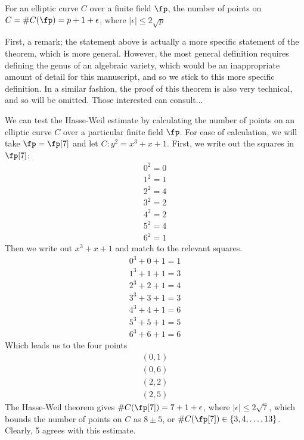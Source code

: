 
\begin{theorem}
For an elliptic curve $C$ over a finite field $\fp$, the number of points on $C = \#C(\fp) = p + 1 + \epsilon$, where $|\epsilon| \leq 2\sqrt{p}$
\end{theorem}
\begin{sproof}
	First, a remark; the statement above is actually a more specific statement of the theorem, which is more general. However, the most general definition requires defining the genus of an algebraic variety, which would be an inappropriate amount of detail for this manuscript, and so we stick to this more specific definition.
	In a similar fashion, the proof of this theorem is also very technical, and so will be omitted. Those interested can consult...
\end{sproof}
We can test the Hasse-Weil estimate by calculating the number of points on an elliptic curve $C$ over a particular finite field $\fp$. For ease of calculation, we will take $\fp = \fp[7]$ and let $C : y^2 = x^3 + x + 1$. First, we write out the squares in $\fp[7]$:
\begin{align*}
0^2 = 0\\
1^2 = 1\\
2^2 = 4\\
3^2 = 2\\
4^2 = 2\\
5^2 = 4\\
6^2 = 1
\end{align*}
Then we write out $x^3+x+1$ and match to the relevant squares.
\begin{align*}
0^3 + 0 + 1 = 1\\
1^3 + 1 + 1 = 3\\
2^3 + 2 + 1 = 4\\
3^3 + 3 + 1 = 3\\
4^3 + 4 + 1 = 6\\
5^3 + 5 + 1 = 5\\
6^3 + 6 + 1 = 6
\end{align*}
Which leads us to the four points
\begin{align*}
(0,1)\\
(0,6)\\
(2,2)\\
(2,5)
\end{align*}
The Hasse-Weil theorem gives $\#C(\fp[7]) = 7 + 1 + \epsilon$, where $|\epsilon| \leq 2\sqrt{7}$, which bounds the number of points on $C$ as $8\pm5$, or $\#C(\fp[7]) \in \{3,4,\ldots,13\}$. Clearly, 5 %
agrees with this estimate.
